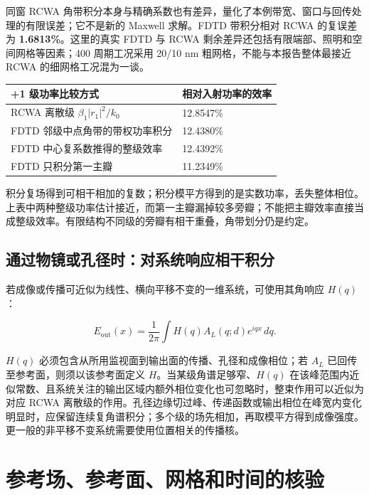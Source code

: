 \documentclass[
  chinese,
  UTF8,
  a4paper,
  11pt]{ctexart}
\newcounter{none} %
\begin{document}
同窗 RCWA
角带积分本身与精确系数也有差异，量化了本例带宽、窗口与回传处理的有限误差；它不是新的
Maxwell 求解。FDTD 带积分相对 RCWA 的复误差为
\textbf{1.6813\%}。这里的真实 FDTD 与 RCWA
剩余差异还包括有限端部、照明和空间网格等因素；400 周期工况采用 20/10 nm
粗网格，不能与本报告整体最接近 RCWA 的细网格工况混为一谈。

{\def\LTcaptype{none} %
\begin{longtable}[]{@{}ll@{}}
\toprule\noalign{}
+1 级功率比较方式 & 相对入射功率的效率 \\
\midrule\noalign{}
\endhead
\bottomrule\noalign{}
\endlastfoot
RCWA 离散级 \(\beta_1|r_1|^2/k_0\) & 12.8547\% \\
FDTD 邻级中点角带的带权功率积分 & 12.4380\% \\
FDTD 中心复系数推得的整级效率 & 12.4392\% \\
FDTD 只积分第一主瓣 & 11.2349\% \\
\end{longtable}
}

积分复场得到可相干相加的复数；积分模平方得到的是实数功率，丢失整体相位。上表中两种整级功率估计接近，而第一主瓣漏掉较多旁瓣；不能把主瓣效率直接当成整级效率。有限结构不同级的旁瓣有相干重叠，角带划分仍是约定。

\subsection{通过物镜或孔径时：对系统响应相干积分}\label{ux901aux8fc7ux7269ux955cux6216ux5b54ux5f84ux65f6ux5bf9ux7cfbux7edfux54cdux5e94ux76f8ux5e72ux79efux5206}

若成像或传播可近似为线性、横向平移不变的一维系统，可使用其角响应
\(H(q)\)：

\[E_{\mathrm{out}}(x)=\frac{1}{2\pi}\int H(q)A_L(q;d)e^{iqx}\,dq.\]

\(H(q)\) 必须包含从所用监视面到输出面的传播、孔径和成像相位；若 \(A_L\)
已回传至参考面，则须以该参考面定义 \(H\)。当某级角谱足够窄、\(H(q)\)
在该峰范围内近似常数、且系统关注的输出区域内额外相位变化也可忽略时，整束作用可以近似为对应
RCWA
离散级的作用。孔径边缘切过峰、传递函数或输出相位在峰宽内变化明显时，应保留连续复角谱积分；多个级的场先相加，再取模平方得到成像强度。更一般的非平移不变系统需要使用位置相关的传播核。

\section{参考场、参考面、网格和时间的核验}\label{ux53c2ux8003ux573aux53c2ux8003ux9762ux7f51ux683cux548cux65f6ux95f4ux7684ux6838ux9a8c}
\end{document}
